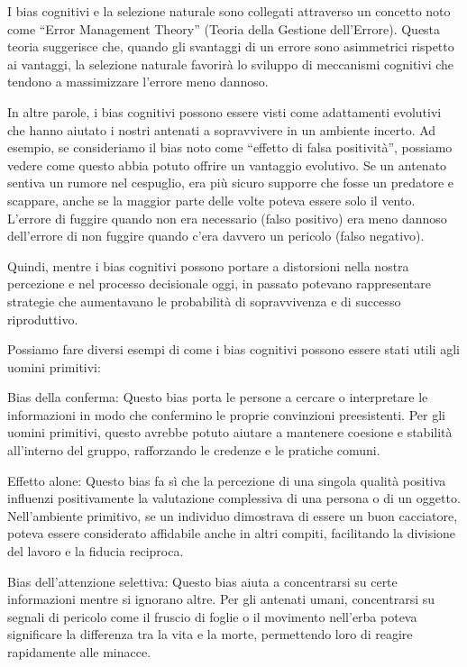 \documentclass[12pt]{book} %
\begin{document}
I bias cognitivi e la selezione naturale sono collegati attraverso un concetto noto come “Error Management Theory”
(Teoria della Gestione dell'Errore). Questa teoria suggerisce che, quando gli svantaggi di un
errore sono asimmetrici rispetto ai vantaggi, la selezione naturale favorirà lo sviluppo di meccanismi cognitivi che
tendono a massimizzare l'errore meno dannoso.

In altre parole, i bias cognitivi possono essere visti come adattamenti evolutivi che hanno aiutato i nostri antenati a
sopravvivere in un ambiente incerto. Ad esempio, se consideriamo il bias noto come “effetto di falsa positività”,
possiamo vedere come questo abbia potuto offrire un vantaggio evolutivo. Se un antenato sentiva un rumore nel
cespuglio, era più sicuro supporre che fosse un predatore e scappare, anche se la maggior parte delle volte poteva
essere solo il vento. L'errore di fuggire quando non era necessario (falso positivo) era meno
dannoso dell'errore di non fuggire quando c'era davvero un pericolo (falso
negativo).

Quindi, mentre i bias cognitivi possono portare a distorsioni nella nostra percezione e nel processo decisionale oggi,
in passato potevano rappresentare strategie che aumentavano le probabilità di sopravvivenza e di successo riproduttivo.

Possiamo fare diversi esempi di come i bias cognitivi possono essere stati utili agli uomini primitivi:

Bias della conferma: Questo bias porta le persone a cercare o interpretare le informazioni in modo che confermino le
proprie convinzioni preesistenti. Per gli uomini primitivi, questo avrebbe potuto aiutare a mantenere coesione e
stabilità all'interno del gruppo, rafforzando le credenze e le pratiche comuni.

Effetto alone: Questo bias fa sì che la percezione di una singola qualità positiva influenzi positivamente la
valutazione complessiva di una persona o di un oggetto. Nell'ambiente primitivo, se un individuo
dimostrava di essere un buon cacciatore, poteva essere considerato affidabile anche in altri compiti, facilitando la
divisione del lavoro e la fiducia reciproca.

Bias dell'attenzione selettiva: Questo bias aiuta a concentrarsi su certe informazioni mentre si
ignorano altre. Per gli antenati umani, concentrarsi su segnali di pericolo come il fruscio di foglie o il movimento
nell'erba poteva significare la differenza tra la vita e la morte, permettendo loro di reagire
rapidamente alle minacce.
\end{document}
